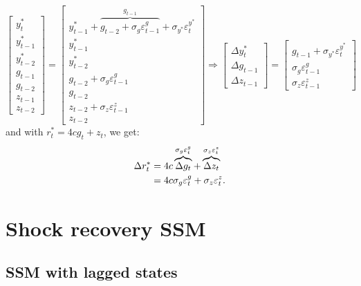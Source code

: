 \documentclass[a4paper,12pt]{article}
\newcommand{\vsp}[1]{\vspace*{#1mm}}\newcommand{\hsp}[1]{\hspace*{#1mm}}  }
\begin{document}
\begin{equation}
\begin{bmatrix}
y_{t}^{\ast } \\ 
y_{t-1}^{\ast } \\ 
y_{t-2}^{\ast } \\ 
g_{t-1} \\ 
g_{t-2} \\ 
z_{t-1} \\ 
z_{t-2}%
\end{bmatrix}%
=%
\begin{bmatrix}
y_{t-1}^{\ast }+\overbrace{g_{t-2}+\sigma _{g}\varepsilon _{t-1}^{g}}%
^{g_{t-1}}+\sigma _{y^{\ast }}\varepsilon _{t}^{y^{\ast }} \\ 
y_{t-1}^{\ast } \\ 
y_{t-2}^{\ast } \\ 
g_{t-2}+\sigma _{g}\varepsilon _{t-1}^{g} \\ 
g_{t-2} \\ 
z_{t-2}+\sigma _{z}\varepsilon _{t-1}^{z} \\ 
z_{t-2}%
\end{bmatrix}%
\Rightarrow 
\begin{bmatrix}
\Delta y_{t}^{\ast } \\ 
\Delta g_{t-1} \\ 
\Delta z_{t-1}%
\end{bmatrix}%
=%
\begin{bmatrix}
g_{t-1}+\sigma _{y^{\ast }}\varepsilon _{t}^{y^{\ast }} \\ 
\sigma _{g}\varepsilon _{t-1}^{g} \\ 
\sigma _{z}\varepsilon _{t-1}^{z}%
\end{bmatrix}
\label{lwb}
\end{equation}%
and with $r_{t}^{\ast }=4cg_{t}+z_{t}$, we get: \vsp{-4} 
\begin{align}
\Delta r_{t}^{\ast }& =4c\overbrace{\Delta g_{t}}^{\sigma _{g}\varepsilon
_{t}^{g}}+\overbrace{\Delta z_{t}}^{\sigma _{z}\varepsilon _{t}^{z}}  \notag
\\
& =4c\sigma _{g}\varepsilon _{t}^{g}+\sigma _{z}\varepsilon _{t}^{z}.
\label{drstar}
\end{align}

\section{Shock recovery SSM}

\subsection{SSM with lagged states}
\end{document}
